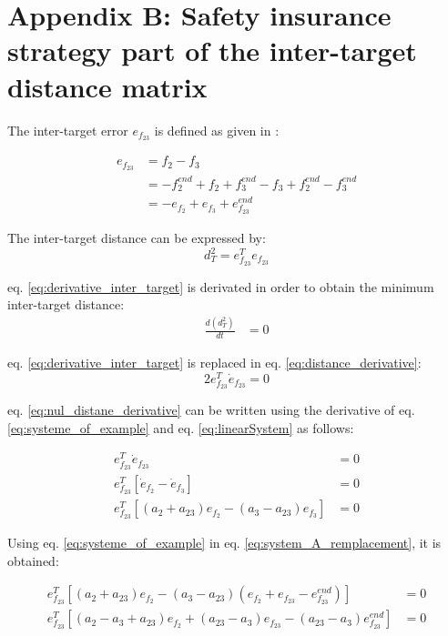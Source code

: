 \appendix 
\thispagestyle{empty}

\hypertarget{AppendixB}{}\section*{Appendix B: Safety insurance strategy part of the inter-target distance matrix} 
The inter-target error $e_{f_{23}}$ is defined as given in \cite{8430659}: 

\begin{align} \label{eq:systeme_of_example}
    e_{f_{23}}&= f_2-f_3 \nonumber \\
    &=-f_2^{end} + f_2 + f_3^{end} - f_3 + f_2^{end} - f_3^{end} \nonumber \\
    &=-e_{f_2} + e_{f_3} + e_{f_{23}}^{end}
\end{align}

The inter-target distance can be expressed by: 
\begin{equation}\label{eq:derivative_inter_target}
    d_T^2 = e_{f_{23}}^Te_{f_{23}}
\end{equation}

eq. \ref{eq:derivative_inter_target} is derivated in order to obtain the minimum inter-target distance: 
\begin{align} \label{eq:distance_derivative}
    \frac{d(d_T^2)}{dt}&= 0 
\end{align}

eq. \ref{eq:derivative_inter_target} is replaced in eq. \ref{eq:distance_derivative}:
\begin{equation} \label{eq:nul_distane_derivative}
    2e_{f_{23}}^T\dot{e}_{f_{23}}=0
\end{equation}

eq. \ref{eq:nul_distane_derivative} can be written using the derivative of eq. \ref{eq:systeme_of_example} and eq. \ref{eq:linearSystem} as follows: 

\begin{align} \label{eq:system_A_remplacement}
    e_{f_{23}}^T\dot{e}_{f_{23}}&=0 \nonumber \\
    e_{f_{23}}^T[\dot{e}_{f_2} - \dot{e}_{f_3}]&=0 \nonumber \\
    e_{f_{23}}^T[(a_2+a_{23}){e}_{f_2} - (a_3 - a_{23}){e}_{f_3}]&=0
\end{align}

Using eq. \ref{eq:systeme_of_example} in eq. \ref{eq:system_A_remplacement}, it is obtained: 

\begin{align} \label{eq:final_condi_distance_CORM_2}
    e_{f_{23}}^T[(a_2+a_{23}){e}_{f_2} - (a_3 - a_{23})(e_{f_2} + {e}_{f_{23}} - {e}_{f_{23}}^{end})]&=0 \nonumber \\
  e_{f_{23}}^T[(a_2-a_3 +a_{23}){e}_{f_2} + (a_{23}-a_3){e}_{f_{23}} - (a_{23}-a_3){e}_{f_{23}}^{end}]&=0
\end{align}

